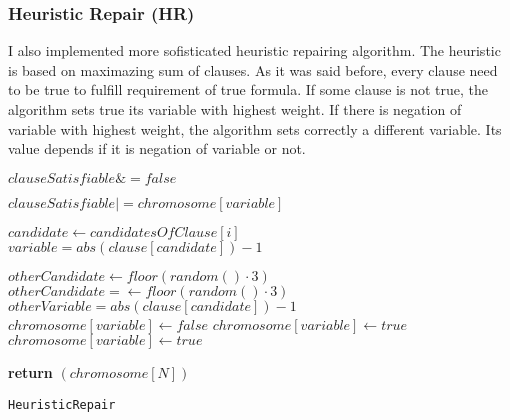\documentclass{article}
\begin{document}
		\subsubsection{Heuristic Repair (HR)}
		I also implemented more sofisticated heuristic repairing algorithm. The heuristic is based on maximazing sum of clauses. As it was said before, every clause need to be true to fulfill requirement of true formula. If some clause is not true, the algorithm sets true its variable with highest weight. If there is negation of variable with highest weight, the algorithm sets correctly a different variable. Its value depends if it is negation of variable or not.
		\begin{center}
			\begin{minipage}{1\linewidth} %
				\begin{algorithm}[H]
					\hrulefill
					\medskip

					 {
						$clauseSatisfiable \&= false$

						 {
							 {
								$clauseSatisfiable |= chromosome[variable]$
							}
						}

						 {
							$candidate \gets candidatesOfClause[i]$\\
							$variable = abs(clause[candidate])-1$

							 {
								$otherCandidate \gets floor(random()\cdot 3)$\\ 
								 {
									$otherCandidate = \gets floor(random()\cdot 3)$\\
								}
								$otherVariable = abs(clause[candidate])-1$\\
								 {
									$chromosome[variable] \gets false$
								}
								 {
									$chromosome[variable] \gets true$
								}
							}
							 {
								$chromosome[variable] \gets true$
							}
						}
					}
					{\bf return} $(chromosome[N])$ \;
					\caption{\texttt{HeuristicRepair}} %
					\label{alg:HeuristicRepair}   %
				\end{algorithm}
			\end{minipage}
		\end{center}
\end{document}
